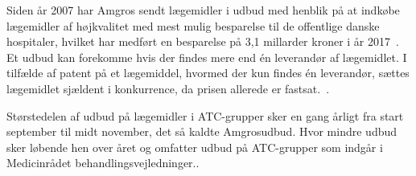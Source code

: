 Siden år 2007 har Amgros sendt lægemidler i udbud med henblik på at indkøbe lægemidler af højkvalitet med mest mulig besparelse til de offentlige danske hospitaler, hvilket har medført en besparelse på 3,1 millarder kroner i år 2017~\citep{Amgros2017b}. Et udbud kan forekomme hvis der findes mere end én leverandør af lægemidlet. I tilfælde af patent på et lægemiddel, hvormed der kun findes én leverandør, sættes lægemidlet sjældent i konkurrence, da prisen allerede er fastsat.~\citep{Amgros2015}.

Størstedelen af udbud på lægemidler i ATC-grupper sker en gang årligt fra start september til midt november, det så kaldte Amgrosudbud\citep{Sygehusapoteket2017}. Hvor mindre udbud sker løbende hen over året og omfatter udbud på ATC-grupper som indgår i Medicinrådet behandlingsvejledninger.\citep{Sygehusapoteket2017, Danskeregioner}. 